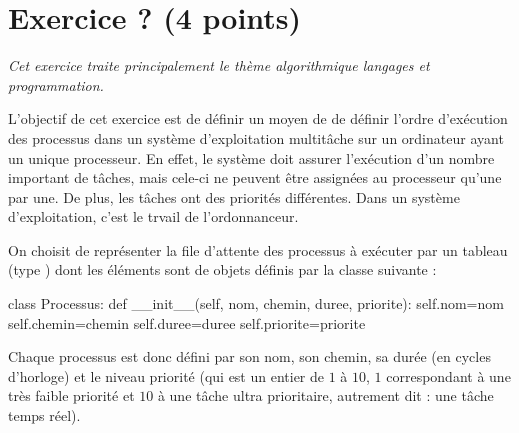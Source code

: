 \documentclass[11pt,a4paper,french,twoside]{VcCours}
\begin{document}
\section*{Exercice ? (4 points)}
\emph{Cet exercice traite principalement le thème \og{} algorithmique
langages et programmation\fg{}.}

L'objectif de cet exercice est de définir un moyen de de définir l'ordre 
d'exécution des processus dans un système d'exploitation multitâche sur un 
ordinateur ayant un unique processeur. En effet, le système doit assurer
l'exécution d'un nombre important de tâches, mais cele-ci ne peuvent être
assignées au processeur qu'une par une. De plus, les tâches ont des priorités
différentes. Dans un système d'exploitation, c'est le trvail de l'ordonnanceur.

\medskip
On choisit de représenter la file d'attente des processus à exécuter par 
un tableau (type ) dont les éléments sont de objets définis 
par la classe suivante :
\begin{Python}
class Processus:
    def __init__(self, nom, chemin, duree, priorite):
        self.nom=nom
        self.chemin=chemin
        self.duree=duree
        self.priorite=priorite
\end{Python}
Chaque processus est donc défini par son nom, son chemin, sa durée (en cycles 
d'horloge) et le niveau priorité (qui est un entier de $1$ à $10$, 
$1$ correspondant à une très faible priorité et $10$ à une tâche ultra prioritaire,
autrement dit : une tâche temps réel). 
\end{document}

